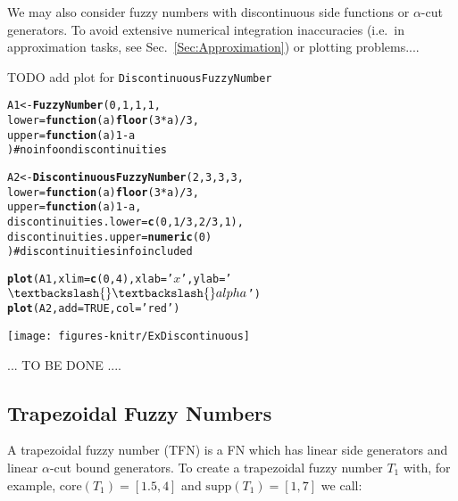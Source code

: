 \documentclass[11pt]{article}\usepackage{graphicx, color}
\makeatletter
\newcommand{\hlfunctioncall}[1]{\textcolor[rgb]{0.501960784313725,0,0.329411764705882}{\textbf{#1}}}%
\newcommand{\hlstring}[1]{\textcolor[rgb]{0.6,0.6,1}{#1}}%
\newcommand{\hlcomment}[1]{\textcolor[rgb]{0.180392156862745,0.6,0.341176470588235}{#1}}%
\newenvironment{kframe}{%
 \def\at@end@of@kframe{}%
 \ifinner\ifhmode%
  \def\at@end@of@kframe{\end{minipage}}%
  \begin{minipage}{\columnwidth}%
 \fi\fi%
 \def\FrameCommand##1{\hskip\@totalleftmargin \hskip-\fboxsep
 \colorbox{shadecolor}{##1}\hskip-\fboxsep
     \hskip-\linewidth \hskip-\@totalleftmargin \hskip\columnwidth}%
 \MakeFramed {\advance\hsize-\width
   \@totalleftmargin\z@ \linewidth\hsize
   \@setminipage}}%
 {\par\unskip\endMakeFramed%
 \at@end@of@kframe}
\newenvironment{knitrout}{}{} %
\makeatother
\begin{document}
We may also consider fuzzy numbers with discontinuous side
functions or $\alpha$-cut generators.
To avoid extensive numerical integration inaccuracies 
(i.e.~in approximation tasks, see Sec.~\ref{Sec:Approximation})
or plotting problems....

TODO add plot for \texttt{DiscontinuousFuzzyNumber}

\begin{knitrout}\small
{}\color{fgcolor}\begin{kframe}
\begin{alltt}
A1 <- \hlfunctioncall{FuzzyNumber}(0,1,1,1,
         lower=\hlfunctioncall{function}(a) \hlfunctioncall{floor}(3*a)/3,
         upper=\hlfunctioncall{function}(a) 1-a
) \hlcomment{# no info on discontinuities}

A2 <- \hlfunctioncall{DiscontinuousFuzzyNumber}(2,3,3,3,
         lower=\hlfunctioncall{function}(a) \hlfunctioncall{floor}(3*a)/3,
         upper=\hlfunctioncall{function}(a) 1-a,
         discontinuities.lower=\hlfunctioncall{c}(0, 1/3, 2/3, 1),
         discontinuities.upper=\hlfunctioncall{numeric}(0)
) \hlcomment{# discontinuities info included}

\hlfunctioncall{plot}(A1, xlim=\hlfunctioncall{c}(0,4), xlab=\hlstring{'$x$'}, ylab=\hlstring{'$\textbackslash{}\textbackslash{}alpha$'})
\hlfunctioncall{plot}(A2, add=TRUE, col=\hlstring{'red'})
\end{alltt}
\end{kframe}

{\centering \texttt{[image: figures-knitr/ExDiscontinuous]} 

}



\end{knitrout}




... TO BE DONE ....


\subsection{Trapezoidal Fuzzy Numbers}\label{Sec:TFNdef}

A trapezoidal fuzzy number (TFN) is a FN which has linear
side generators and linear $\alpha$-cut bound generators.
To create a trapezoidal fuzzy number $T_1$
with, for example, $\mathrm{core}(T_1)=[1.5,4]$
and $\mathrm{supp}(T_1)=[1,7]$ we call:
\end{document}
